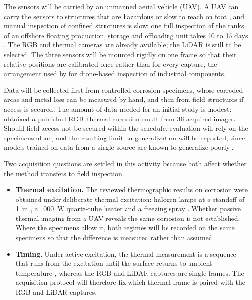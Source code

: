 The sensors will be carried by an unmanned aerial vehicle (UAV). A UAV can carry
the sensors to structures that are hazardous or slow to reach on foot
\citep{Savino2025,Nooralishahi2022}, and manual inspection of confined
structures is slow: one full inspection of the tanks of an offshore floating
production, storage and offloading unit takes 10 to 15 days \citep{Soares2023}.
The RGB and thermal cameras are already available; the LiDAR is still to be
selected. The three sensors will be mounted rigidly on one frame so that their
relative positions are calibrated once rather than for every capture, the
arrangement used by \citet{Nooralishahi2022} for drone-based inspection of
industrial components.

Data will be collected first from controlled corrosion specimens, whose corroded
areas and metal loss can be measured by hand, and then from field structures if
access is secured. The amount of data needed for an initial study is modest:
\citet{Lim2021} obtained a published RGB--thermal corrosion result from 36
acquired images. Should field access not be secured within the schedule,
evaluation will rely on the specimens alone, and the resulting limit on
generalization will be reported, since models trained on data from a single
source are known to generalize poorly \citep{Nash2022}.

Two acquisition questions are settled in this activity because both affect
whether the method transfers to field inspection.
\begin{itemize}
  \item \textbf{Thermal excitation.} The reviewed thermographic results on
        corrosion were obtained under deliberate thermal excitation: halogen
        lamps at a standoff of 1~m \citep{Lim2021}, a 1000~W quartz-tube heater
        \citep{Elizalde2023} and a freezing spray \citep{Doshvarpassand2022}.
        Whether passive thermal imaging from a UAV reveals the same corrosion is
        not established. Where the specimens allow it, both regimes will be
        recorded on the same specimens so that the difference is measured
        rather than assumed.
  \item \textbf{Timing.} Under active excitation, the thermal measurement is a
        sequence that runs from the excitation until the surface returns to
        ambient temperature \citep{Doshvarpassand2022}, whereas the RGB and LiDAR
        captures are single frames. The acquisition protocol will therefore fix
        which thermal frame is paired with the RGB and LiDAR captures.
\end{itemize}

